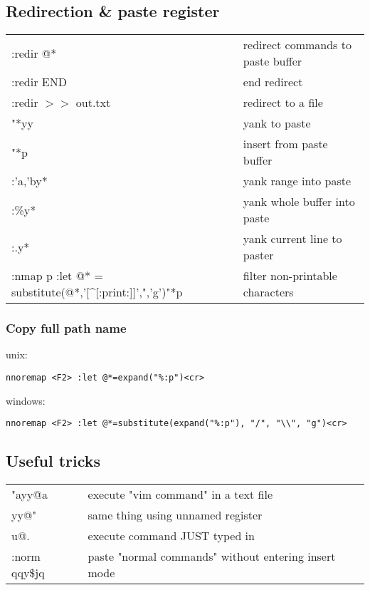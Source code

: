 \subsection{Redirection \& paste register}
\begin{center}
\begin{longtable}{l|l}
 :redir @* & redirect commands to paste buffer\\
 :redir END & end redirect\\
 :redir $>$$>$ out.txt & redirect to a file\\
 "*yy & yank to paste\\
 "*p & insert from paste buffer\\
 :'a,'by* & yank range into paste\\
 :\%y* & yank whole buffer into paste\\
 :.y* & yank current line to paster\\
 :nmap p :let @* = substitute(@*,'[\^{}[:print:]]',",'g')"*p & filter non-printable characters\
\end{longtable}
\end{center}

\subsubsection{Copy full path name}
unix:
\begin{verbatim}
nnoremap <F2> :let @*=expand("%:p")<cr>
\end{verbatim}

windows:
\begin{verbatim}
nnoremap <F2> :let @*=substitute(expand("%:p"), "/", "\\", "g")<cr>
\end{verbatim}

\subsection{Useful tricks}
\begin{center}
\begin{longtable}{l|l}
 "ayy@a & execute "vim command" in a text file\\
 yy@" & same thing using unnamed register\\
 u@. & execute command JUST typed in\\
 :norm qqy\$jq &  paste "normal commands" without entering insert mode
 \end{longtable}
\end{center}
